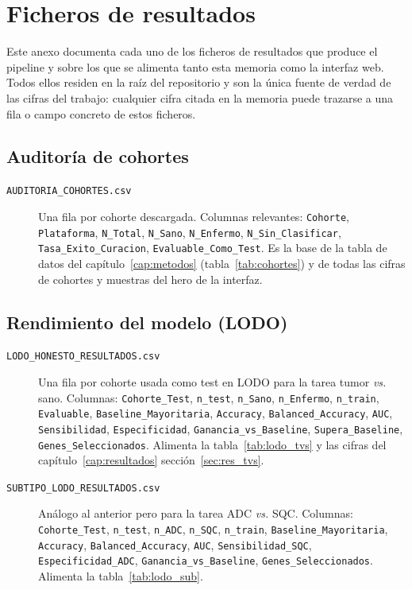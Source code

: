 \chapter{Ficheros de resultados}
\label{anexo:resultados}

Este anexo documenta cada uno de los ficheros de resultados que produce
el pipeline y sobre los que se alimenta tanto esta memoria como la
interfaz web. Todos ellos residen en la raíz del repositorio y son la
única fuente de verdad de las cifras del trabajo: cualquier cifra citada
en la memoria puede trazarse a una fila o campo concreto de estos
ficheros.

\section*{Auditoría de cohortes}
{}

\begin{description}
  \item[\texttt{AUDITORIA\_COHORTES.csv}] Una fila por cohorte
  descargada. Columnas relevantes: \texttt{Cohorte}, \texttt{Plataforma},
  \texttt{N\_Total}, \texttt{N\_Sano}, \texttt{N\_Enfermo},
  \texttt{N\_Sin\_Clasificar}, \texttt{Tasa\_Exito\_Curacion},
  \texttt{Evaluable\_Como\_Test}. Es la base de la tabla de datos del
  capítulo~\ref{cap:metodos} (tabla~\ref{tab:cohortes}) y de todas las
  cifras de cohortes y muestras del hero de la interfaz.
\end{description}

\section*{Rendimiento del modelo (LODO)}
{}

\begin{description}
  \item[\texttt{LODO\_HONESTO\_RESULTADOS.csv}] Una fila por cohorte
  usada como test en LODO para la tarea tumor \emph{vs.} sano. Columnas:
  \texttt{Cohorte\_Test}, \texttt{n\_test}, \texttt{n\_Sano},
  \texttt{n\_Enfermo}, \texttt{n\_train}, \texttt{Evaluable},
  \texttt{Baseline\_Mayoritaria}, \texttt{Accuracy},
  \texttt{Balanced\_Accuracy}, \texttt{AUC}, \texttt{Sensibilidad},
  \texttt{Especificidad}, \texttt{Ganancia\_vs\_Baseline},
  \texttt{Supera\_Baseline}, \texttt{Genes\_Seleccionados}. Alimenta la
  tabla~\ref{tab:lodo_tvs} y las cifras del capítulo~\ref{cap:resultados}
  sección~\ref{sec:res_tvs}.

  \item[\texttt{SUBTIPO\_LODO\_RESULTADOS.csv}] Análogo al anterior pero
  para la tarea ADC \emph{vs.} SQC. Columnas: \texttt{Cohorte\_Test},
  \texttt{n\_test}, \texttt{n\_ADC}, \texttt{n\_SQC}, \texttt{n\_train},
  \texttt{Baseline\_Mayoritaria}, \texttt{Accuracy},
  \texttt{Balanced\_Accuracy}, \texttt{AUC}, \texttt{Sensibilidad\_SQC},
  \texttt{Especificidad\_ADC}, \texttt{Ganancia\_vs\_Baseline},
  \texttt{Genes\_Seleccionados}. Alimenta la tabla~\ref{tab:lodo_sub}.
\end{description}

